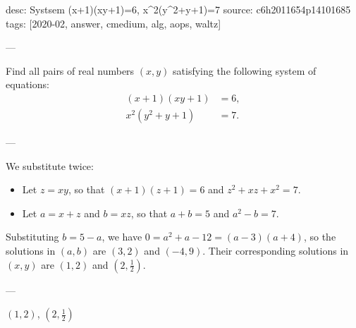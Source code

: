 desc: Systsem (x+1)(xy+1)=6, x^2(y^2+y+1)=7
source: c6h2011654p14101685
tags: [2020-02, answer, cmedium, alg, aops, waltz]

---

Find all pairs of real numbers $(x,y)$ satisfying the following system of equations:
\begin{align*}
    (x+1)(xy+1)&=6,\\
    x^2(y^2+y+1)&=7.
\end{align*}

---

We substitute twice:
\begin{itemize}[itemsep=0em]
    \item Let $z=xy$, so that $(x+1)(z+1)=6$ and $z^2+xz+x^2=7$. 
    \item Let $a=x+z$ and $b=xz$, so that $a+b=5$ and $a^2-b=7$.
\end{itemize}
Substituting $b=5-a$, we have $0=a^2+a-12=(a-3)(a+4)$, so the solutions in $(a,b)$ are $(3,2)$ and $(-4,9)$. Their corresponding solutions in $(x,y)$ are $(1,2)$ and $(2,\tfrac12)$.

---

$(1,2)$, $(2,\tfrac12)$
